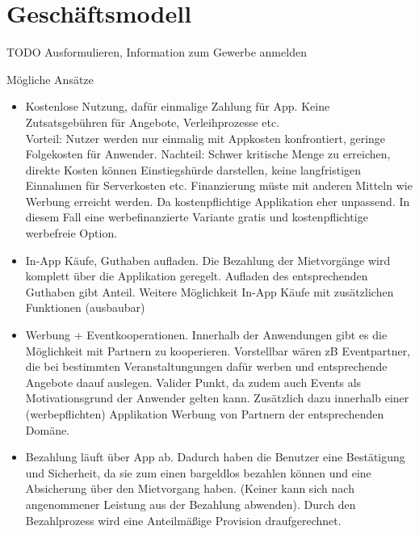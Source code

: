
\section{Geschäftsmodell}
TODO Ausformulieren, Information zum Gewerbe anmelden

Mögliche Ansätze
\begin{itemize}
   \item Kostenlose Nutzung, dafür einmalige Zahlung für App. Keine Zutsatsgebühren für Angebote, Verleihprozesse etc.\\
   Vorteil: Nutzer werden nur einmalig mit Appkosten konfrontiert, geringe Folgekosten für Anwender.
   Nachteil: Schwer kritische Menge zu erreichen, direkte Kosten können Einstiegshürde darstellen, keine langfristigen Einnahmen für Serverkosten etc. Finanzierung müste mit anderen Mitteln wie Werbung erreicht werden. Da kostenpflichtige Applikation eher unpassend. In diesem Fall eine werbefinanzierte Variante gratis und kostenpflichtige werbefreie Option.

   \item In-App Käufe, Guthaben aufladen. Die Bezahlung der Mietvorgänge wird komplett über die Applikation geregelt. Aufladen des entsprechenden Guthaben gibt Anteil. Weitere Möglichkeit In-App Käufe mit zusätzlichen Funktionen (ausbaubar)

   \item Werbung + Eventkooperationen.
   Innerhalb der Anwendungen gibt es die Möglichkeit mit Partnern zu kooperieren. Vorstellbar wären zB Eventpartner, die bei bestimmten Veranstaltungungen dafür werben und entsprechende Angebote daauf auslegen. Valider Punkt, da zudem auch Events als Motivationsgrund der Anwender gelten kann. Zusätzlich dazu innerhalb einer (werbepflichten) Applikation Werbung von Partnern der entsprechenden Domäne.

   \item Bezahlung läuft über App ab. Dadurch haben die Benutzer eine Bestätigung und Sicherheit, da sie zum einen bargeldlos bezahlen können und eine Absicherung über den Mietvorgang haben. (Keiner kann sich nach angenommener Leistung aus der Bezahlung abwenden). Durch den Bezahlprozess wird eine Anteilmäßige Provision draufgerechnet. 


\end{itemize}
 